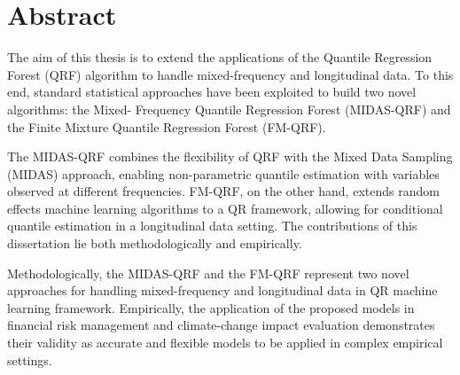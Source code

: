 
\thispagestyle{fancy}			%
\setlength{\parskip}{0pt plus 3.0pt}
\section*{Abstract}
The aim of this thesis is to extend the applications of the Quantile Regression Forest (QRF) algorithm to handle mixed-frequency and longitudinal data. To this end, standard statistical approaches have been exploited to build two novel algorithms: the Mixed- Frequency Quantile Regression Forest (MIDAS-QRF) and the Finite Mixture Quantile Regression Forest (FM-QRF).
\vspace{0.15in}

\noindent The MIDAS-QRF combines the flexibility of QRF with the Mixed Data Sampling (MIDAS) approach, enabling non-parametric quantile estimation with variables observed at different frequencies. FM-QRF, on the other hand, extends random effects machine learning algorithms to a QR framework, allowing for conditional quantile estimation in a longitudinal data setting.
The contributions of this dissertation lie both methodologically and empirically. 

\vspace{0.15in}

\noindent Methodologically, the MIDAS-QRF and the FM-QRF represent two novel approaches for handling mixed-frequency and longitudinal data in QR machine learning framework. Empirically, the application of the proposed models in financial risk management and climate-change impact evaluation demonstrates their validity as accurate and flexible models to be applied in complex empirical settings.
